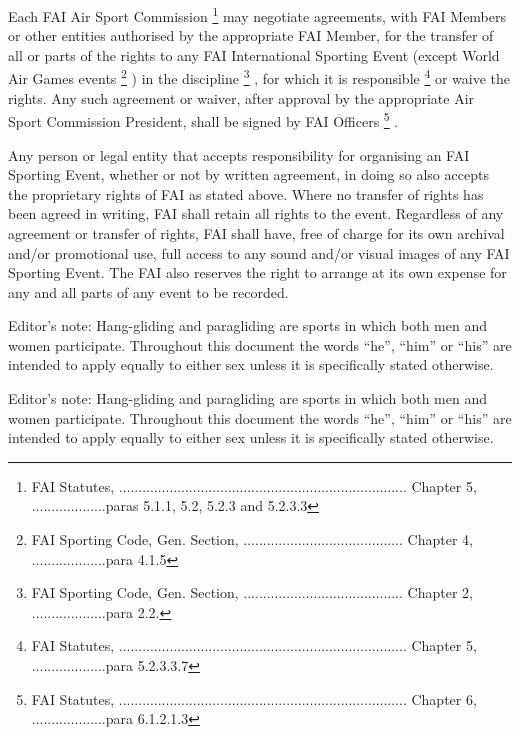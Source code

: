 \documentclass{article}
\begin{document}
Each FAI Air Sport Commission
\footnote{FAI Statutes, .......................................................................... Chapter 5, ...................paras 5.1.1, 5.2, 5.2.3 and 5.2.3.3}
may negotiate agreements, with FAI Members or other entities authorised by the
appropriate FAI Member, for the transfer of all or parts of the rights to any
FAI International Sporting Event (except World Air Games events
\footnote{FAI Sporting Code, Gen. Section, ......................................... Chapter 4, ...................para 4.1.5}
) in the discipline
\footnote{FAI Sporting Code, Gen. Section, ......................................... Chapter 2, ...................para 2.2.}
, for which it is responsible
\footnote{FAI Statutes, .......................................................................... Chapter 5, ...................para 5.2.3.3.7}
or waive the rights. Any such agreement or waiver, after approval by the
appropriate Air Sport Commission President, shall be signed by FAI Officers
\footnote{FAI Statutes, .......................................................................... Chapter 6, ...................para 6.1.2.1.3}
.

Any person or legal entity that accepts responsibility for organising an FAI
Sporting Event, whether or not by written agreement, in doing so also accepts
the proprietary rights of FAI as stated above. Where no transfer of rights has
been agreed in writing, FAI shall retain all rights to the event. Regardless of
any agreement or transfer of rights, FAI shall have, free of charge for its own
archival and/or promotional use, full access to any sound and/or visual images
of any FAI Sporting Event. The FAI also reserves the right to arrange at its
own expense for any and all parts of any event to be recorded.

Editor’s note: Hang-gliding and paragliding are sports in which both men and
women participate. Throughout this document the words “he”, “him” or “his” are
intended to apply equally to either sex unless it is specifically stated
otherwise.

\newpage
Editor’s note: Hang-gliding and paragliding are sports in which both men and
women participate. Throughout this document the words “he”, “him” or “his” are
intended to apply equally to either sex unless it is specifically stated
otherwise.
\end{document}
